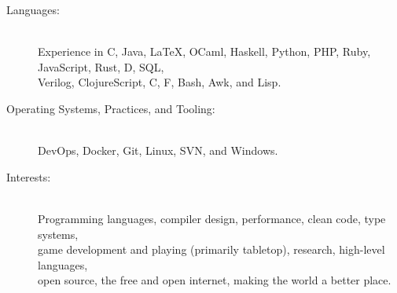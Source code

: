\documentclass[10pt,letterpaper]{article}
\newenvironment{indentsection}[1]%
{\begin{list}{}%
  {\setlength{\leftmargin}{#1}}%
  \item[]%
}
{\end{list}}
\newcommand{\CPP}
{C\nolinebreak[4]\hspace{-.05em}\raisebox{.22ex}{\footnotesize\bf ++}}
\newcommand{\CS}{C\nolinebreak\hspace{-.05em}\raisebox{.6ex}{\scriptsize\bf \#}}
\newcommand{\FS}{F\nolinebreak\hspace{-.05em}\raisebox{.6ex}{\scriptsize\bf \#}}
\begin{document}
\begin{indentsection}{\parindent}
\begin{description}
  \item[Languages:] \ \\
  Experience in \CPP , Java, \LaTeX, OCaml, Haskell, Python, PHP, Ruby, JavaScript, Rust, D, SQL, \\  Verilog, ClojureScript, \CS, \FS, Bash, Awk, and Lisp.
  \item[Operating Systems, Practices, and Tooling:] \ \\
  DevOps, Docker, Git, Linux, SVN, and Windows.
  \item[Interests:] \ \\
  Programming languages, compiler design, performance, clean code, type systems, \\ game development and playing (primarily tabletop), research, high-level languages, \\ open source, the free and open internet, making the world a better place.
\end{description}
\end{indentsection}
\end{document}
